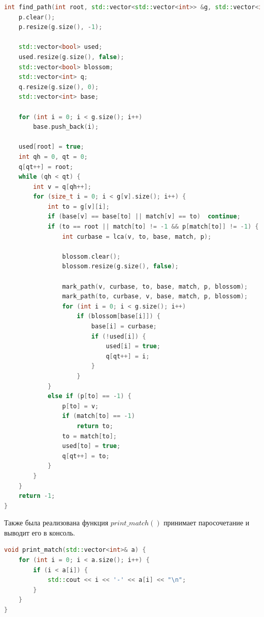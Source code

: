 \documentclass[14pt, a4paper]{extarticle}
\begin{document}
    \begin{lstlisting}[language=c++]
int find_path(int root, std::vector<std::vector<int>> &g, std::vector<int> &match, std::vector<int>& p) {
	p.clear();
	p.resize(g.size(), -1);

	std::vector<bool> used;
	used.resize(g.size(), false);
	std::vector<bool> blossom;
	std::vector<int> q;
	q.resize(g.size(), 0);
	std::vector<int> base;

	for (int i = 0; i < g.size(); i++)
		base.push_back(i);

	used[root] = true;
	int qh = 0, qt = 0;
	q[qt++] = root;
	while (qh < qt) {
		int v = q[qh++];
		for (size_t i = 0; i < g[v].size(); i++) {
			int to = g[v][i];
			if (base[v] == base[to] || match[v] == to)  continue;
			if (to == root || match[to] != -1 && p[match[to]] != -1) {
				int curbase = lca(v, to, base, match, p);
				
				blossom.clear();
				blossom.resize(g.size(), false);

				mark_path(v, curbase, to, base, match, p, blossom);
				mark_path(to, curbase, v, base, match, p, blossom);
				for (int i = 0; i < g.size(); i++)
					if (blossom[base[i]]) {
						base[i] = curbase;
						if (!used[i]) {
							used[i] = true;
							q[qt++] = i;
						}
					}
			}
			else if (p[to] == -1) {
				p[to] = v;
				if (match[to] == -1)
					return to;
				to = match[to];
				used[to] = true;
				q[qt++] = to;
			}
		}
	}
	return -1;
}
    \end{lstlisting}

    Также была реализована функция $print\_match()$ принимает паросочетание и выводит его в консоль.

    \begin{lstlisting}[language=c++]
void print_match(std::vector<int>& a) {
	for (int i = 0; i < a.size(); i++) {
		if (i < a[i]) {
			std::cout << i << '-' << a[i] << "\n";
		}
	}
}
    \end{lstlisting}
    
    \pagebreak
    
\end{document}
